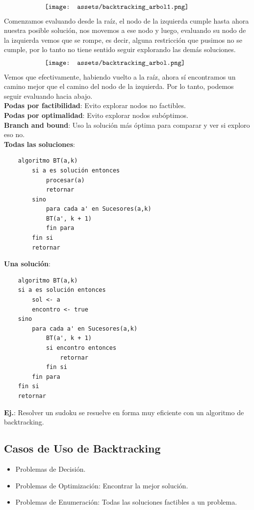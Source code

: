 \documentclass[10pt,a4paper]{article}
\begin{document}
\[\begin{minipage}[b]{0.7\textwidth}
    \texttt{[image: assets/backtracking\_arbol1.png]}
\end{minipage}\]
Comenzamos evaluando desde la raíz, el nodo de la izquierda cumple hasta ahora nuestra posible solución, nos movemos a ese nodo y luego, evaluando su nodo de la izquierda vemos que se rompe, es decir, alguna restricción que pusimos no se cumple, por lo tanto no tiene sentido seguir explorando las demás soluciones. \\
\[\begin{minipage}[b]{0.7\textwidth}
    \texttt{[image: assets/backtracking\_arbol.png]}
\end{minipage}\]
Vemos que efectivamente, habiendo vuelto a la raíz, ahora sí encontramos un camino mejor que el camino del nodo de la izquierda. Por lo tanto, podemos seguir evaluando hacia abajo. \\
\textbf{Podas por factibilidad}: Evito explorar nodos no factibles. \\
\textbf{Podas por optimalidad}: Evito explorar nodos subóptimos. \\ 
\textbf{Branch and bound}: Uso la solución más óptima para comparar y ver si exploro eso no. \\
\textbf{Todas las soluciones}:
\begin{lstlisting}
    algoritmo BT(a,k)
        si a es solución entonces
            procesar(a)
            retornar
        sino
            para cada a' en Sucesores(a,k)
            BT(a', k + 1)
            fin para
        fin si
        retornar
\end{lstlisting}
\textbf{Una solución}:
\begin{lstlisting}
    algoritmo BT(a,k)
    si a es solución entonces
        sol <- a
        encontro <- true
    sino
        para cada a' en Sucesores(a,k)
            BT(a', k + 1)
            si encontro entonces
                retornar
            fin si
        fin para
    fin si
    retornar
\end{lstlisting}
\textbf{Ej.}: Resolver un sudoku se resuelve en forma muy eficiente con un algoritmo de backtracking.
\subsection*{Casos de Uso de Backtracking}
\begin{itemize}
    \item Problemas de Decisión.
    \item Problemas de Optimización: Encontrar la mejor solución.
    \item Problemas de Enumeración: Todas las soluciones factibles a un problema.
\end{itemize}
\end{document}
